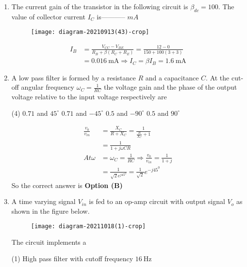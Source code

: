 \begin{enumerate}
\begin{answer}
\end{answer}
	\item The current gain of the transistor in the following circuit is $\beta_{d c}=100$. The value of collector current $I_{C}$ is----------- $m A$
\begin{figure}[H]
\centering
\texttt{[image: diagram-20210913(43)-crop]}
\end{figure}
\begin{answer}
\begin{align*}
I_{B}&=\frac{V_{C C}-V_{B E}}{R_{B}+\beta\left(R_{C}+R_{E}\right)}=\frac{12-0}{150+100(3+3)}\\&=0.016 \mathrm{~mA} \Rightarrow I_{C}=\beta I_{B}=1.6 \mathrm{~mA}
\end{align*}
\end{answer}
	\item A low pass filter is formed by a resistance $R$ and a capacitance $C .$ At the cut-off angular frequency $\omega_{C}=\frac{1}{R C}$ the voltage gain and the phase of the output voltage relative to the input voltage respectively are
\begin{tasks}(4)
\task[\textbf{A.}] $0.71$ and $45^{\circ}$
\task[\textbf{B.}]  $0.71$ and $-45^{\circ}$
\task[\textbf{C.}] $0.5$ and $-90^{\circ}$
\task[\textbf{D.}] $0.5$ and $90^{\circ}$
\end{tasks}
\begin{answer}
\begin{align*}
\frac{v_{0}}{v_{i n}}&=\frac{X_{C}}{R+X_{C}}=\frac{1}{\frac{R}{X_{C}}+1}\\&=\frac{1}{1+j \omega C R}\\
At \omega&=\omega_{C}=\frac{1}{R C} \Rightarrow \frac{v_{0}}{v_{i n}}=\frac{1}{1+j}\\&=\frac{1}{\sqrt{2} e^{j 45^{0}}}=\frac{1}{\sqrt{2}} e^{-j 45^{0}}
\end{align*}
So the correct answer is \textbf{Option (B)}
\end{answer}
	\item A time varying signal $V_{i n}$ is fed to an op-amp circuit with output signal $V_{o}$ as shown in the figure below.\\
	\begin{figure}[H]
		\centering
		\texttt{[image: diagram-20211018(1)-crop]}
	\end{figure}
	The circuit implements a
\begin{tasks}(1)
\task[\textbf{A.}] High pass filter with cutoff frequency $16 \mathrm{~Hz}$

\end{tasks}
\end{enumerate}

